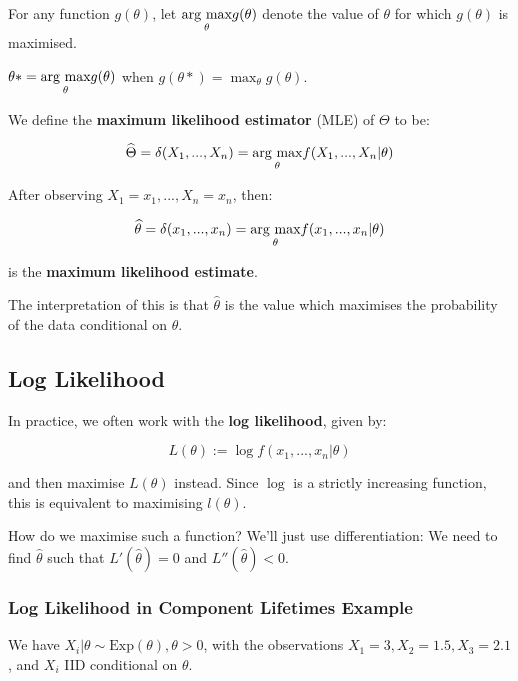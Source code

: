\documentclass[a4paper]{article}
\begin{document}
        \begin{definition}
            For any function $g(\theta)$, let $\underset{{\theta}}{\text{arg max}} g(\theta)$ denote
            the value of $\theta$ for which $g(\theta)$ is maximised.

            $\theta* = \underset{{\theta}}{\text{arg max}} g(\theta)$ when $g(\theta*) = \max_\theta
            g(\theta)$.

            We define the \textbf{maximum likelihood estimator} (MLE) of
            $\Theta$ to be:

            \[
                \widehat \Theta = \delta(X_1, ..., X_n) = \underset{{\theta}}{\text{arg max}} f(X_1,
                ..., X_n | \theta)
            \]

            After observing $X_1 = x_1, ..., X_n = x_n$, then:

            \[
                \widehat \theta = \delta(x_1, ..., x_n) = \underset{{\theta}}{\text{arg max}} f(x_1,
                ..., x_n | \theta)
            \]

            is the \textbf{maximum likelihood estimate}.
        \end{definition}

        The interpretation of this is that $\widehat \theta$ is the value which
        maximises the probability of the data conditional on $\theta$.

        \subsection{Log Likelihood}
            In practice, we often work with the \textbf{log likelihood}, given
            by:

            \[
                L(\theta) := \log f(x_1, ..., x_n | \theta)
            \]

            and then maximise $L(\theta)$ instead. Since $\log$ is a strictly
            increasing function, this is equivalent to maximising $l(\theta)$.

            How do we maximise such a function? We'll just use differentiation:
            We need to find $\widehat \theta$ such that $L'(\widehat \theta) =
            0$ and $L''(\widehat \theta) < 0$.

            \subsubsection{Log Likelihood in Component Lifetimes Example}
                We have $X_i | \theta \sim \text{Exp}(\theta), \theta > 0$, with
                the observations $X_1 = 3, X_2 = 1.5, X_3 = 2.1$, and $X_i$ IID
                conditional on $\theta$.
\end{document}
